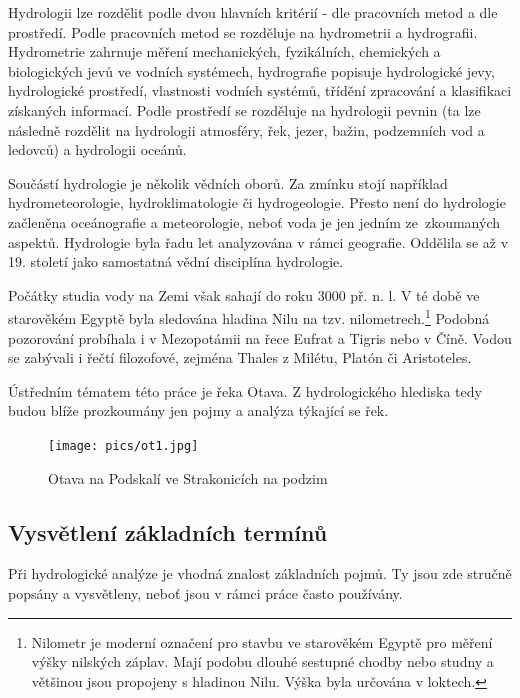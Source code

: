 \documentclass[thesis=M,czech]{FITthesis}[2012/06/26]
\begin{document}
Hydrologii lze rozdělit podle dvou hlavních kritérií - dle pracovních metod a dle prostředí. Podle pracovních metod se rozděluje na hydrometrii a hydrografii. Hydrometrie zahrnuje měření mechanických, fyzikálních, chemických a biologických jevů ve vodních systémech, hydrografie popisuje hydrologické jevy, hydrologické prostředí, vlastnosti vodních systémů, třídění zpracování a klasifikaci získaných informací. Podle prostředí se rozděluje na hydrologii pevnin (ta lze následně rozdělit na hydrologii atmosféry, řek, jezer, bažin, podzemních vod a ledovců) a hydrologii oceánů. 

Součástí hydrologie je několik vědních oborů. Za zmínku stojí například hydrometeorologie, hydroklimatologie či hydrogeologie. Přesto není do hydrologie začleněna oceánografie a meteorologie, neboť voda je jen jedním ze~zkoumaných aspektů. Hydrologie byla řadu let analyzována v rámci geografie. Oddělila se až v 19. století jako samostatná vědní disciplína hydrologie. 

Počátky studia vody na Zemi však sahají do roku 3000 př. n. l. V té době ve starověkém Egyptě byla sledována hladina Nilu na tzv. nilometrech.\footnote{Nilometr je moderní označení pro stavbu ve starověkém Egyptě pro měření výšky nilských záplav. Mají podobu dlouhé sestupné chodby nebo studny a většinou jsou propojeny s hladinou Nilu. Výška byla určována v loktech.} Podobná pozorování probíhala i v Mezopotámii na řece Eufrat a Tigris nebo v Číně. Vodou se zabývali i řečtí filozofové, zejména Thales z Milétu, Platón či Aristoteles. 


Ústředním tématem této práce je řeka Otava. Z hydrologického hlediska tedy budou blíže prozkoumány jen pojmy a analýza týkající se řek. \cite{definiceHydro} \cite{FGkniha} \cite{hydro_net}


\begin{figure}[h!]
	\centering
	\texttt{[image: pics/ot1.jpg]}
	\caption{Otava na Podskalí ve Strakonicích na podzim}
	\label{obrazek:ot1}
\end{figure}


\subsection{Vysvětlení základních termínů}
Při hydrologické analýze je vhodná znalost základních pojmů. Ty jsou zde stručně popsány a vysvětleny, neboť jsou v rámci práce často používány. \cite{terminy}
\end{document}
